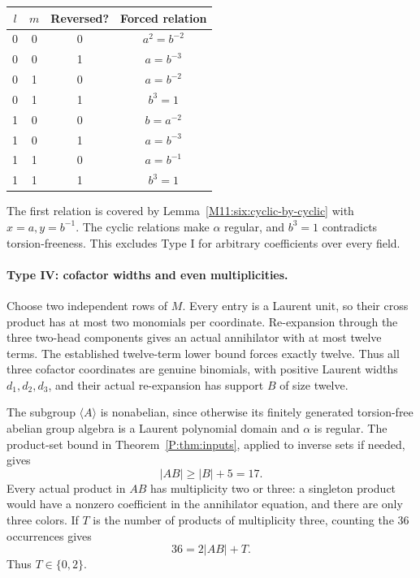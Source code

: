 \documentclass[11pt,a4paper,oneside]{report}
\theoremstyle{definition}
\theoremstyle{remark}
\begin{document}
\begin{center}
\small
\begin{tabular}{cccc}
\hline
\(l\)&\(m\)&Reversed?&Forced relation\\
\hline
0&0&0&\(a^2=b^{-2}\)\\
0&0&1&\(a=b^{-3}\)\\
0&1&0&\(a=b^{-2}\)\\
0&1&1&\(b^3=1\)\\
1&0&0&\(b=a^{-2}\)\\
1&0&1&\(a=b^{-3}\)\\
1&1&0&\(a=b^{-1}\)\\
1&1&1&\(b^3=1\)\\
\hline
\end{tabular}
\end{center}

The first relation is covered by Lemma~\ref{M11:six:cyclic-by-cyclic} with
\(x=a,y=b^{-1}\). The cyclic relations make \(\alpha\) regular, and
\(b^3=1\) contradicts torsion-freeness. This excludes Type I for
arbitrary coefficients over every field.

\paragraph{Type IV: cofactor widths and even multiplicities.}
Choose two independent rows of \(M\). Every entry is a Laurent unit,
so their cross product has at most two monomials per coordinate.
Re-expansion through the three two-head components gives an actual
annihilator with at most twelve terms. The established twelve-term
lower bound forces exactly twelve. Thus all three cofactor coordinates
are genuine binomials, with positive Laurent widths \(d_1,d_2,d_3\),
and their actual re-expansion has support \(B\) of size twelve.

The subgroup \(\langle A\rangle\) is nonabelian, since otherwise its
finitely generated torsion-free abelian group algebra is a Laurent
polynomial domain and \(\alpha\) is regular. The product-set bound in
Theorem~\ref{P:thm:inputs}, applied to inverse sets if needed, gives
\[
 |AB|\ge |B|+5=17.
\]
Every actual product in \(AB\) has multiplicity two or three: a
singleton product would have a nonzero coefficient in the annihilator
equation, and there are only three colors. If \(T\) is the number of
products of multiplicity three, counting the 36 occurrences gives
\begin{equation}\label{M11:six:multiplicity}
 36=2|AB|+T.
\end{equation}
Thus \(T\in\{0,2\}\).
\end{document}
